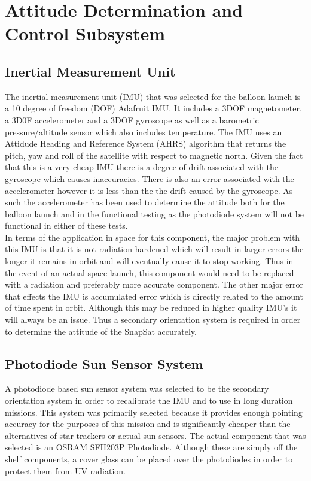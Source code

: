\section{Attitude Determination and Control Subsystem}
\subsection{Inertial Measurement Unit}
The inertial measurement unit (IMU) that was selected for the balloon launch is a 10 degree of freedom (DOF) Adafruit IMU.  It includes a 3DOF magnetometer, a 3D0F accelerometer and a 3DOF gyroscope as well as a barometric pressure/altitude sensor which also includes temperature.  The IMU uses an Attidude Heading and Reference System (AHRS) algorithm that returns the pitch, yaw and roll of the satellite with respect to magnetic north.  Given the fact that this is a very cheap IMU there is a degree of drift associated with the gyroscope which causes inaccuracies.  There is also an error associated with the accelerometer however it is less than the the drift caused by the gyroscope. As such the accelerometer has been used to determine the attitude both for the balloon launch and in the functional testing as the photodiode system will not be functional in either of these tests.\\


In terms of the application in space for this component, the major problem with this IMU is that it is not radiation hardened which will result in larger errors the longer it remains in orbit and will eventually cause it to stop working.  Thus in the event of an actual space launch, this component would need to be replaced with a radiation and preferably more accurate component.  The other major error that effects the IMU is accumulated error which is directly related to the amount of time spent in orbit.  Although this may be reduced in higher quality IMU's it will always be an issue.  Thus a secondary orientation system is required in order to determine the attitude of the SnapSat accurately.

\subsection{Photodiode Sun Sensor System}
A photodiode based sun sensor system was selected to be the secondary orientation system in order to recalibrate the IMU and to use in long duration missions.  This system was primarily selected because it provides enough pointing accuracy for the purposes of this mission and is significantly cheaper than the alternatives of star trackers or actual sun sensors.  The actual component that was selected is an OSRAM SFH203P Photodiode.  Although these are simply off the shelf components, a cover glass can be placed over the photodiodes in order to protect them from UV radiation.




